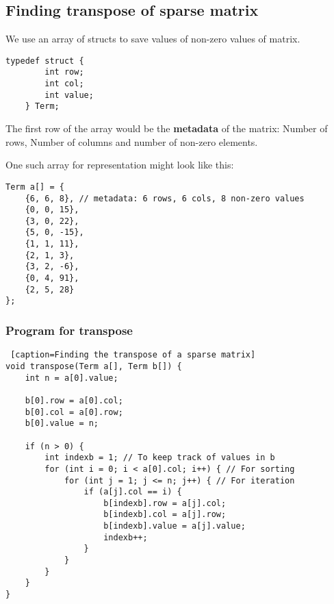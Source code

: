 \documentclass{article}
\begin{document}
\subsection{Finding transpose of sparse matrix}

We use an array of structs to save values of non-zero values of matrix.
\begin{lstlisting}[caption={Representing sparse matrix}]
    typedef struct {
        int row;
        int col;
        int value;
    } Term;
\end{lstlisting}

The first row of the array would be the \textbf{metadata} of the matrix: Number of rows, Number of columns and number of non-zero elements.

One such array for representation might look like this:
\begin{lstlisting}
Term a[] = {
    {6, 6, 8}, // metadata: 6 rows, 6 cols, 8 non-zero values
    {0, 0, 15},
    {3, 0, 22},
    {5, 0, -15},
    {1, 1, 11},
    {2, 1, 3},
    {3, 2, -6},
    {0, 4, 91},
    {2, 5, 28}
};
\end{lstlisting}

\subsubsection{Program for transpose}
\begin{lstlisting} [caption=Finding the transpose of a sparse matrix]
void transpose(Term a[], Term b[]) {
    int n = a[0].value;

    b[0].row = a[0].col;
    b[0].col = a[0].row;
    b[0].value = n;

    if (n > 0) {
        int indexb = 1; // To keep track of values in b
        for (int i = 0; i < a[0].col; i++) { // For sorting
            for (int j = 1; j <= n; j++) { // For iteration
                if (a[j].col == i) {
                    b[indexb].row = a[j].col;
                    b[indexb].col = a[j].row;
                    b[indexb].value = a[j].value;
                    indexb++;
                }
            }
        }
    }
}
\end{lstlisting}
\end{document}
